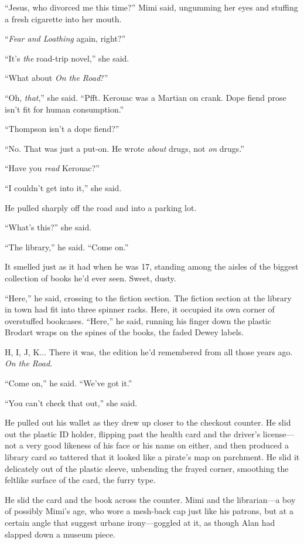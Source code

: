 ``Jesus, who divorced me this time?'' Mimi said, ungumming her eyes
and stuffing a fresh cigarette into her mouth.

``\textit{Fear and Loathing} again, right?''

``It's \textit{the} road-trip novel,'' she said.

``What about \textit{On the Road}?''

``Oh, \textit{that},'' she said.  ``Pfft.  Kerouac was a Martian on
crank.  Dope fiend prose isn't fit for human consumption.''

``Thompson isn't a dope fiend?''

``No.  That was just a put-on.  He wrote \textit{about} drugs, not
\textit{on} drugs.''

``Have you \textit{read} Kerouac?''

``I couldn't get into it,'' she said.

He pulled sharply off the road and into a parking lot.

``What's this?'' she said.

``The library,'' he said.  ``Come on.''

It smelled just as it had when he was 17, standing among the aisles of
the biggest collection of books he'd ever seen.  Sweet, dusty.

``Here,'' he said, crossing to the fiction section.  The fiction
section at the library in town had fit into three spinner racks. 
Here, it occupied its own corner of overstuffed bookcases.  ``Here,''
he said, running his finger down the plastic Brodart wraps on the
spines of the books, the faded Dewey labels.

H, I, J, K...  There it was, the edition he'd remembered from all
those years ago.  \textit{On the Road.}

``Come on,'' he said.  ``We've got it.''

``You can't check that out,'' she said.

He pulled out his wallet as they drew up closer to the checkout
counter.  He slid out the plastic ID holder, flipping past the health
card and the driver's license---not a very good likeness of his face
or his name on either, and then produced a library card so tattered
that it looked like a pirate's map on parchment.  He slid it
delicately out of the plastic sleeve, unbending the frayed corner,
smoothing the feltlike surface of the card, the furry type.

He slid the card and the book across the counter.  Mimi and the
librarian---a boy of possibly Mimi's age, who wore a mesh-back cap
just like his patrons, but at a certain angle that suggest urbane
irony---goggled at it, as though Alan had slapped down a museum piece.

